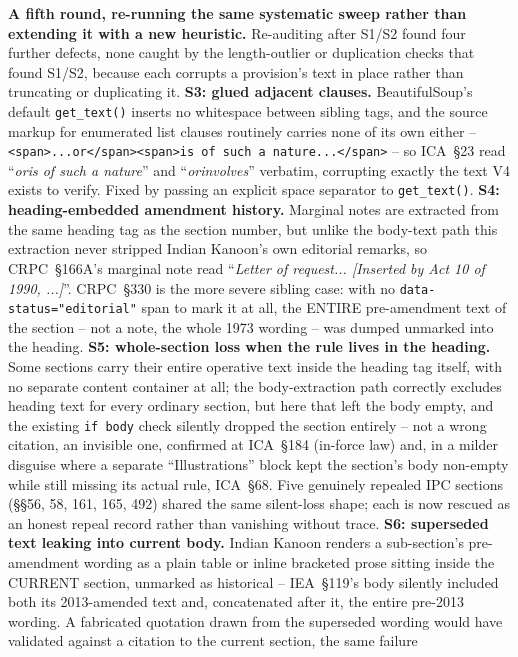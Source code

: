 \documentclass[conference]{IEEEtran}
\begin{document}
\textbf{A fifth round, re-running the same systematic sweep rather than
extending it with a new heuristic.} Re-auditing after S1/S2 found four
further defects, none caught by the length-outlier or duplication checks
that found S1/S2, because each corrupts a provision's text in place rather
than truncating or duplicating it. \textbf{S3: glued adjacent clauses.}
BeautifulSoup's default \texttt{get\_text()} inserts no whitespace between
sibling tags, and the source markup for enumerated list clauses routinely
carries none of its own either --
\texttt{<span>...or</span><span>is of such a nature...</span>} -- so
ICA~\S23 read ``\emph{oris of such a nature}'' and ``\emph{orinvolves}''
verbatim, corrupting exactly the text V4 exists to verify. Fixed by passing
an explicit space separator to \texttt{get\_text()}. \textbf{S4:
heading-embedded amendment history.} Marginal notes are extracted from the
same heading tag as the section number, but unlike the body-text path this
extraction never stripped Indian Kanoon's own editorial remarks, so
CRPC~\S166A's marginal note read ``\emph{Letter of request... [Inserted by
Act 10 of 1990, ...]}''. CRPC~\S330 is the more severe sibling case: with no
\texttt{data-status="editorial"} span to mark it at all, the ENTIRE
pre-amendment text of the section -- not a note, the whole 1973 wording --
was dumped unmarked into the heading. \textbf{S5: whole-section loss when
the rule lives in the heading.} Some sections carry their entire operative
text inside the heading tag itself, with no separate content container at
all; the body-extraction path correctly excludes heading text for every
ordinary section, but here that left the body empty, and the existing
\texttt{if body} check silently dropped the section entirely -- not a wrong
citation, an invisible one, confirmed at ICA~\S184 (in-force law) and, in a
milder disguise where a separate ``Illustrations'' block kept the section's
body non-empty while still missing its actual rule, ICA~\S68. Five
genuinely repealed IPC sections (\S\S56, 58, 161, 165, 492) shared the same
silent-loss shape; each is now rescued as an honest repeal record rather
than vanishing without trace. \textbf{S6: superseded text leaking into
current body.} Indian Kanoon renders a sub-section's pre-amendment wording
as a plain table or inline bracketed prose sitting inside the CURRENT
section, unmarked as historical -- IEA~\S119's body silently included both
its 2013-amended text and, concatenated after it, the entire pre-2013
wording. A fabricated quotation drawn from the superseded wording would
have validated against a citation to the current section, the same failure
\end{document}
